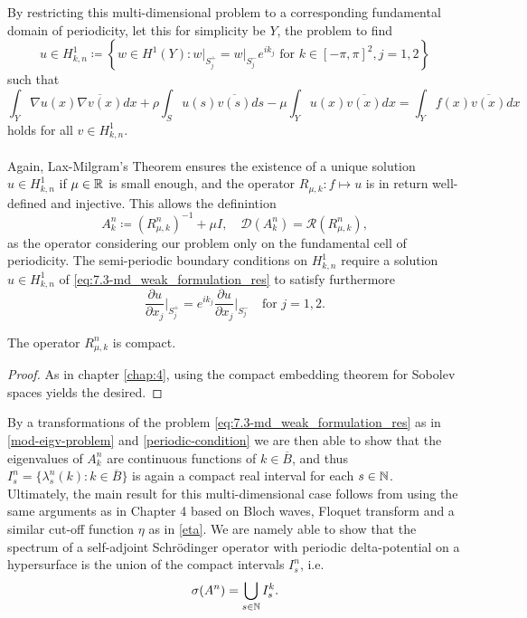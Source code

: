 By restricting this multi-dimensional problem to a corresponding fundamental domain of periodicity, let this for simplicity be $Y$, the problem to find 
	\[ u \in H^{1}_{k, n} \coloneqq \left\{ w \in H^{1}(Y) \colon w \big|_{S_{j}^{+}} = w \big|_{S_{j}^{-}} e^{i k_{j}} \text{ for } k \in [-\pi, \pi]^{2}, j = 1,2 \right\} \] %
such that
	\begin{equation}
		\int_{Y} \nabla u(x) \overline{\nabla v(x)} dx + \rho \int_{S} u(s) \overline{v(s)} ds - \mu \int_{Y} u(x) \overline{v(x)} dx = \int_{Y} f(x) \overline{v(x)} dx \label{eq:7.3-md_weak_formulation_res}
	\end{equation} 
holds for all $v \in H^{1}_{k, n}$. 
~\\ ~\\
Again, Lax-Milgram's Theorem ensures the existence of a unique solution $u \in H^{1}_{k, n}$ if $\mu \in \mathbb{R}$ is small enough, and the operator $R_{\mu, k} \colon f \mapsto u$ is in return well-defined and injective. This allows the definintion 
	\[ A_{k}^{n} \coloneqq \left(R_{\mu, k}^{n}\right)^{-1} + \mu I, \quad \mathcal{D}(A_{k}^{n}) = \mathcal{R}(R_{\mu, k}^{n}), \]
as the operator considering our problem only on the fundamental cell of periodicity. The semi-periodic boundary conditions on $H^{1}_{k,n}$ require a solution $u \in H^{1}_{k, n}$ of \eqref{eq:7.3-md_weak_formulation_res} to satisfy furthermore
	\[ \frac{\partial u}{\partial x_{j}}\big|_{S_{j}^{+}} = e^{ik_{j}} \frac{\partial u}{\partial x_{j}}\big|_{S_{j}^{-}} \quad \text{for } j = 1, 2.  \]
	
\begin{theorem}
	The operator $R_{\mu, k}^{n}$ is compact.	

	\begin{proof}
		As in chapter \ref{chap:4}, using the compact embedding theorem for Sobolev spaces yields the desired. %
	\end{proof}
\end{theorem}

By a transformations of the problem \eqref{eq:7.3-md_weak_formulation_res} as in \eqref{mod-eigv-problem} and \eqref{periodic-condition} we are then able to show that the eigenvalues of $A^{n}_{k}$ are continuous functions of $k \in \overline{B}$, and thus $I^{n}_{s} = \{ \lambda^{n}_{s}(k) : k \in \overline{B} \}$ is again a compact real interval for each $s \in \mathbb{N}$.  %
~\newline ~\newline
Ultimately, the main result for this multi-dimensional case follows from using the same arguments as in Chapter 4 based on Bloch waves, Floquet transform and a similar cut-off function $\eta$ as in \eqref{eta}. We are namely able to show that the spectrum of a self-adjoint Schrödinger operator with periodic delta-potential on a hypersurface is the union of the  compact intervals $I^{n}_{s}$, i.e.
	\[ \sigma(A^{n}) = \bigcup_{s \in \mathbb{N}} I^{k}_{s}. \]